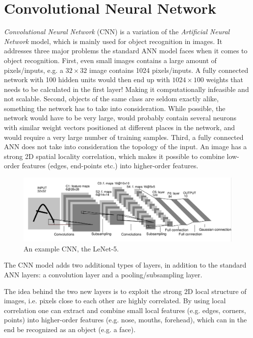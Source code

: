 \section{Convolutional Neural Network}

\textit{Convolutional Neural Network}\cite{LeCun1998} (CNN) is a variation of the \textit{Artificial Neural Network} model, which is mainly used for object recognition in images. It addresses three major problems the standard ANN model faces when it comes to object recognition. First, even small images contains a large amount of pixels/inputs, e.g. a $ 32 \times 32 $ image contains 1024 pixels/inputs. A fully connected network with 100 hidden units would then end up with $ 1024 \times 100 $ weights that needs to be calculated in the first layer! Making it computationally infeasible and not scalable. Second, objects of the same class are seldom exactly alike, something the network has to take into consideration. While possible, the network would have to be very large, would probably contain several neurons with similar weight vectors positioned at different places in the network, and would require a very large number of training samples. Third, a fully connected ANN does not take into consideration the topology of the input. An image has a strong 2D spatial locality correlation, which makes it possible to combine low-order features (edges, end-points etc.) into higher-order features.  


\begin{figure}[h!]
  \centering
      \includegraphics[width=1.0\textwidth]{Figures/Background/convnet}
  \caption{An example CNN, the LeNet-5\cite{LeCun1998}. }
\end{figure}

The CNN model adds two additional types of layers, in addition to the standard ANN layers: a convolution layer and a pooling/subsampling layer.

The idea behind the two new layers is to exploit the strong 2D local structure of images, i.e. pixels close to each other are highly correlated. By using local correlation one can extract and combine small local features (e.g. edges, corners, points) into higher-order features (e.g. nose, mouths, forehead), which can in the end be recognized as an object (e.g. a face). 

